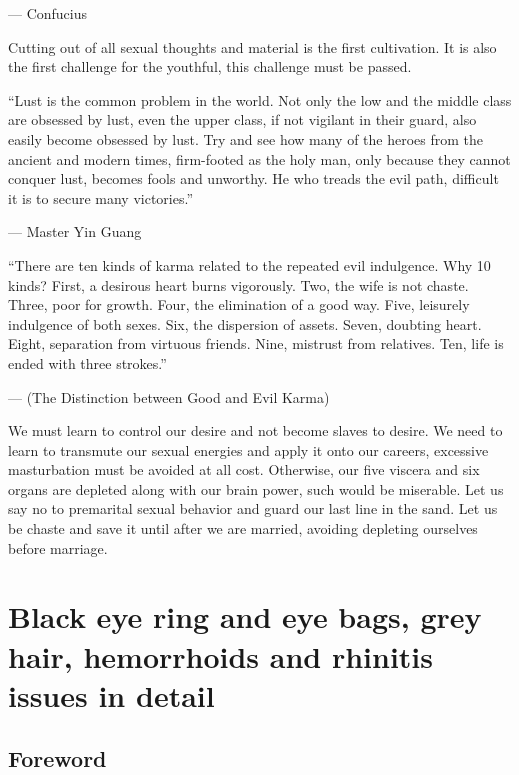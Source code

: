 \documentclass[
]{book}
\begin{document}
--- Confucius

Cutting out of all sexual thoughts and material is the first cultivation. It is also the first challenge for the youthful, this challenge must be passed.

``Lust is the common problem in the world. Not only the low and the middle class are obsessed by lust, even the upper class, if not vigilant in their guard, also easily become obsessed by lust. Try and see how many of the heroes from the ancient and modern times, firm-footed as the holy man, only because they cannot conquer lust, becomes fools and unworthy. He who treads the evil path, difficult it is to secure many victories.''

--- Master Yin Guang

``There are ten kinds of karma related to the repeated evil indulgence. Why 10 kinds? First, a desirous heart burns vigorously. Two, the wife is not chaste. Three, poor for growth. Four, the elimination of a good way. Five, leisurely indulgence of both sexes. Six, the dispersion of assets. Seven, doubting heart. Eight, separation from virtuous friends. Nine, mistrust from relatives. Ten, life is ended with three strokes.''

--- (The Distinction between Good and Evil Karma)

We must learn to control our desire and not become slaves to desire. We need to learn to transmute our sexual energies and apply it onto our careers, excessive masturbation must be avoided at all cost. Otherwise, our five viscera and six organs are depleted along with our brain power, such would be miserable. Let us say no to premarital sexual behavior and guard our last line in the sand. Let us be chaste and save it until after we are married, avoiding depleting ourselves before marriage.

\hypertarget{black-eye-ring-and-eye-bags-grey-hair-hemorrhoids-and-rhinitis-issues-in-detail}{%
\chapter{Black eye ring and eye bags, grey hair, hemorrhoids and rhinitis issues in detail}\label{black-eye-ring-and-eye-bags-grey-hair-hemorrhoids-and-rhinitis-issues-in-detail}}

\hypertarget{foreword}{%
\section{Foreword}\label{foreword}}
\end{document}
